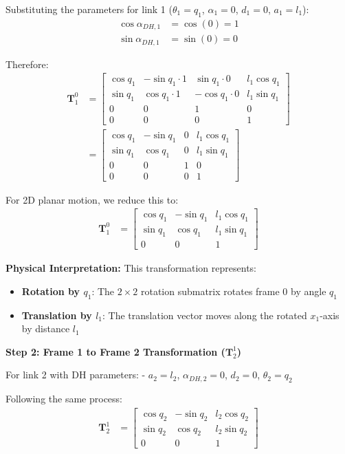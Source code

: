 \documentclass[11pt,a4paper]{article}
\begin{document}
Substituting the parameters for link 1 ($\theta_1 = q_1$, $\alpha_1 = 0$, $d_1 = 0$, $a_1 = l_1$):
\begin{align}
\cos\alpha_{DH,1} &= \cos(0) = 1 \\
\sin\alpha_{DH,1} &= \sin(0) = 0
\end{align}

Therefore:
\begin{align}
\bm{T}_1^0 &= \begin{bmatrix}
\cos q_1 & -\sin q_1 \cdot 1 & \sin q_1 \cdot 0 & l_1\cos q_1 \\
\sin q_1 & \cos q_1 \cdot 1 & -\cos q_1 \cdot 0 & l_1\sin q_1 \\
0 & 0 & 1 & 0 \\
0 & 0 & 0 & 1
\end{bmatrix} \\
&= \begin{bmatrix}
\cos q_1 & -\sin q_1 & 0 & l_1\cos q_1 \\
\sin q_1 & \cos q_1 & 0 & l_1\sin q_1 \\
0 & 0 & 1 & 0 \\
0 & 0 & 0 & 1
\end{bmatrix}
\end{align}

For 2D planar motion, we reduce this to:
\begin{align}
\bm{T}_1^0 &= \begin{bmatrix}
\cos q_1 & -\sin q_1 & l_1\cos q_1 \\
\sin q_1 & \cos q_1 & l_1\sin q_1 \\
0 & 0 & 1
\end{bmatrix}
\end{align}

\textbf{Physical Interpretation:}
This transformation represents:
\begin{itemize}
    \item \textbf{Rotation by $q_1$}: The $2 \times 2$ rotation submatrix rotates frame 0 by angle $q_1$
    \item \textbf{Translation by $l_1$}: The translation vector moves along the rotated $x_1$-axis by distance $l_1$
\end{itemize}

\textbf{Step 2: Frame 1 to Frame 2 Transformation ($\bm{T}_2^1$)}

For link 2 with DH parameters:
- $a_2 = l_2$, $\alpha_{DH,2} = 0$, $d_2 = 0$, $\theta_2 = q_2$

Following the same process:
\begin{align}
\bm{T}_2^1 &= \begin{bmatrix}
\cos q_2 & -\sin q_2 & l_2\cos q_2 \\
\sin q_2 & \cos q_2 & l_2\sin q_2 \\
0 & 0 & 1
\end{bmatrix}
\end{align}
\end{document}
